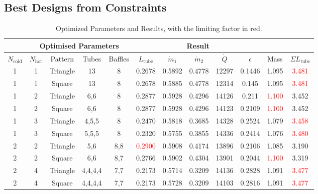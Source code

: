 \documentclass{article}
\begin{document}
\subsection{Best Designs from Constraints}

\begin{table}[h!]
  \centering
  \begin{tabular}{|c|c|c|c|c|c|c|c|c|c|c|c|}
      \hline
      \rowcolor{gray!30}
      \multicolumn{3}{|c|}{\textbf{Configuration}} & \multicolumn{4}{c|}{\textbf{Optimised Parameters}} & \multicolumn{5}{c|}{\textbf{Result}} \\ \hline
      \rowcolor{gray!10}
      $N_\text{cold}$ & $N_\text{hot}$ & Pattern & Tubes & Baffles & $L_\text{tube}$ & $\dot{m}_1$ & $\dot{m}_2$ & $\dot{Q}$ & $\epsilon$ & Mass & $\Sigma L_\text{tube}$ \\ \hline
      1 & 1 & Triangle & 13 & 8 & 0.2678 & 0.5892 & 0.4778 & 12297 & 0.1446 & 1.095 & \textcolor{red}{3.481} \\ \hline
      1 & 1 & Square & 13 & 8 & 0.2678 & 0.5885 & 0.4778 & 12314 & 0.145 & 1.095 & \textcolor{red}{3.481} \\ \hline
      1 & 2 & Triangle & 6,6 & 8 & 0.2877 & 0.5928 & 0.4296 & 14126 & 0.211 & \textcolor{red}{1.100} & 3.452 \\ \hline
      1 & 2 & Square & 6,6 & 8 & 0.2877 & 0.5928 & 0.4296 & 14123 & 0.2109 & \textcolor{red}{1.100} & 3.452 \\ \hline
      \rowcolor{yellow!30}
      1 & 3 & Triangle & 4,5,5 & 8 & 0.2470 & 0.5818 & 0.3685 & 14328 & 0.2524 & 1.079 & \textcolor{red}{3.458} \\ \hline
      1 & 3 & Square & 5,5,5 & 8 & 0.2320 & 0.5755 & 0.3855 & 14336 & 0.2414 & 1.076 & \textcolor{red}{3.480} \\ \hline
      2 & 2 & Triangle & 5,6 & 8,8 & \textcolor{red}{0.2900} & 0.5908 & 0.4174 & 13896 & 0.2106 & 1.085 & 3.190 \\ \hline
      2 & 2 & Square & 6,6 & 8,7 & 0.2766 & 0.5902 & 0.4304 & 13901 & 0.2044 & \textcolor{red}{1.100} & 3.319 \\ \hline
      2 & 4 & Triangle & 4,4,4,4 & 7,7 & 0.2173 & 0.5714 & 0.3209 & 14136 & 0.2828 & 1.091 & \textcolor{red}{3.477} \\ \hline
      2 & 4 & Square & 4,4,4,4 & 7,7 & 0.2173 & 0.5728 & 0.3209 & 14103 & 0.2816 & 1.091 & \textcolor{red}{3.477} \\ \hline
  \end{tabular}
  \caption{Optimized Parameters and Results, with the limiting factor in red.}
  \label{table:designs}
\end{table}
\end{document}
